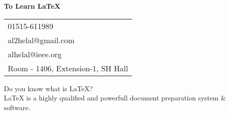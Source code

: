 \documentclass{article}
\begin{document}
\vspace*{\fill}
\begin{center}
  {\Huge\textbf{To Learn \LaTeX{}}}
\\
  \LARGE
\vspace{2cm}
  \begin{tabular}{l}
 \faPhone{} 01515-611989\\
  \faEnvelope{} al2helal@gmail.com\\
  \faEnvelope{} alhelal@ieee.org\\
  \faHome{} Room - 1406, Extension-1, SH Hall
  \end{tabular}

\vspace{2cm}
Do you know what is \LaTeX{}?\\
  \LaTeX{} is a highly qualified and powerfull document preparation system \& software.
\end{center}
\vspace*{\fill}
 
\end{document}
